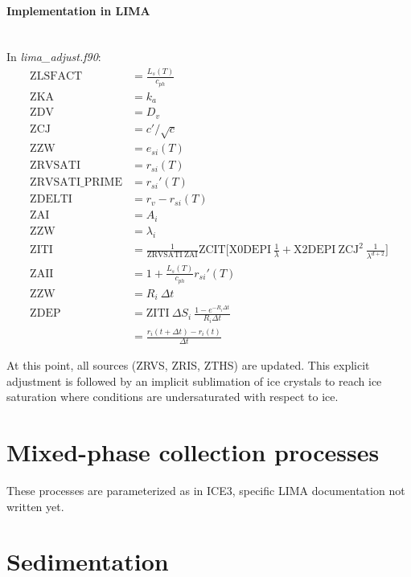 \paragraph{Implementation in LIMA}
~\\
In \emph{lima\_adjust.f90}:
\begin{align}
 \mathrm{ZLSFACT} &= \frac{L_s(T)}{c_{ph}} \\
 \mathrm{ZKA} &= k_a \\
 \mathrm{ZDV} &= D_v \\
 \mathrm{ZCJ} &= c'/\sqrt c \\
 \mathrm{ZZW} &= e_{si}(T) \\
 \mathrm{ZRVSATI} &= r_{si}(T) \\
 \mathrm{ZRVSATI\_PRIME} &= r_{si}'(T) \\
 \mathrm{ZDELTI} &= r_v - r_{si}(T) \\
 \mathrm{ZAI} &= A_i \\
 \mathrm{ZZW} &= \lambda_i \\
 \mathrm{ZITI} &= \frac{1}{\mathrm{ZRVSATI} ~ \mathrm{ZAI}} \mathrm{ZCIT} \bigg[\mathrm{X0DEPI} ~ \frac{1}{\lambda} + \mathrm{X2DEPI} ~ \mathrm{ZCJ}^2 ~ \frac{1}{\lambda^{d+2}}\bigg]  \\ 
 \mathrm{ZAII} &= 1 + \frac{L_s(T)}{c_{ph}} r_{si}'(T) \\
 \mathrm{ZZW} &= R_i ~ \Delta t \\
 \mathrm{ZDEP} &= \mathrm{ZITI} ~ \Delta S_i ~ \frac{1 - e^{-R_i\Delta t}}{R_i\Delta t} \\
 &= \frac{r_i(t + \Delta t) - r_i(t)}{\Delta t}
\end{align}

At this point, all sources (ZRVS, ZRIS, ZTHS) are updated. This explicit adjustment is followed by an implicit sublimation of ice crystals to reach ice saturation where conditions are undersaturated with respect to ice.




\section{Mixed-phase collection processes}

These processes are parameterized as in ICE3, specific LIMA documentation not written yet.




\section{Sedimentation}

